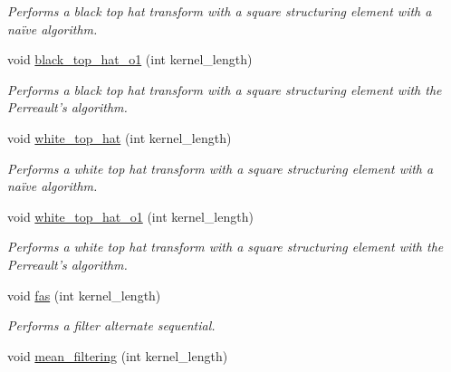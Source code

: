 \begin{DoxyCompactItemize}
\begin{DoxyCompactList}\small\item\em Performs a black top hat transform with a square structuring element with a naïve algorithm. \end{DoxyCompactList}\item 
\hypertarget{classofeli_1_1_filters_a6343e4176fd069a285b6da83de0cd63d}{void \hyperlink{classofeli_1_1_filters_a6343e4176fd069a285b6da83de0cd63d}{black\-\_\-top\-\_\-hat\-\_\-o1} (int kernel\-\_\-length)}\label{classofeli_1_1_filters_a6343e4176fd069a285b6da83de0cd63d}

\begin{DoxyCompactList}\small\item\em Performs a black top hat transform with a square structuring element with the Perreault's algorithm. \end{DoxyCompactList}\item 
\hypertarget{classofeli_1_1_filters_adaade4352062899127d46615a8e31b42}{void \hyperlink{classofeli_1_1_filters_adaade4352062899127d46615a8e31b42}{white\-\_\-top\-\_\-hat} (int kernel\-\_\-length)}\label{classofeli_1_1_filters_adaade4352062899127d46615a8e31b42}

\begin{DoxyCompactList}\small\item\em Performs a white top hat transform with a square structuring element with a naïve algorithm. \end{DoxyCompactList}\item 
\hypertarget{classofeli_1_1_filters_a2e3a6b4aa3329dcb021430748c83d992}{void \hyperlink{classofeli_1_1_filters_a2e3a6b4aa3329dcb021430748c83d992}{white\-\_\-top\-\_\-hat\-\_\-o1} (int kernel\-\_\-length)}\label{classofeli_1_1_filters_a2e3a6b4aa3329dcb021430748c83d992}

\begin{DoxyCompactList}\small\item\em Performs a white top hat transform with a square structuring element with the Perreault's algorithm. \end{DoxyCompactList}\item 
\hypertarget{classofeli_1_1_filters_a525926351892d87d4fee244474d9ac8f}{void \hyperlink{classofeli_1_1_filters_a525926351892d87d4fee244474d9ac8f}{fas} (int kernel\-\_\-length)}\label{classofeli_1_1_filters_a525926351892d87d4fee244474d9ac8f}

\begin{DoxyCompactList}\small\item\em Performs a filter alternate sequential. \end{DoxyCompactList}\item 
\hypertarget{classofeli_1_1_filters_a9b4e4ebbfe46d648181eb4193d829972}{void \hyperlink{classofeli_1_1_filters_a9b4e4ebbfe46d648181eb4193d829972}{mean\-\_\-filtering} (int kernel\-\_\-length)}\label{classofeli_1_1_filters_a9b4e4ebbfe46d648181eb4193d829972}


\end{DoxyCompactItemize}
